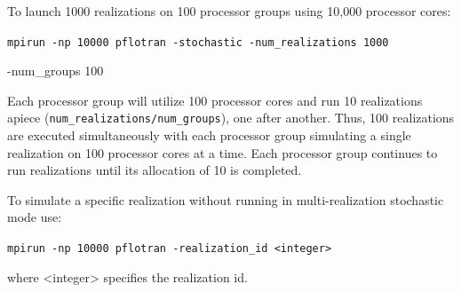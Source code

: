 \documentclass[12pt]{article}
\begin{document}
To launch 1000 realizations on 100 processor groups using 10,000 processor cores:

\noindent
{\tt mpirun -np 10000 pflotran -stochastic -num\_realizations 1000 

-num\_groups 100}

Each processor group will utilize 100 processor cores and run 10 realizations apiece \linebreak ({\tt num\_realizations/num\_groups}), one after another. Thus, 100 realizations are executed simultaneously with each processor group simulating a single realization on 100 processor cores at a time. Each processor group continues to run realizations until its allocation of 10 is completed.

\noindent
To simulate a specific realization without running in multi-realization stochastic mode use:

{\tt mpirun -np 10000 pflotran -realization\_id <integer>}

\noindent
where <integer> specifies the realization id.
\end{document}

